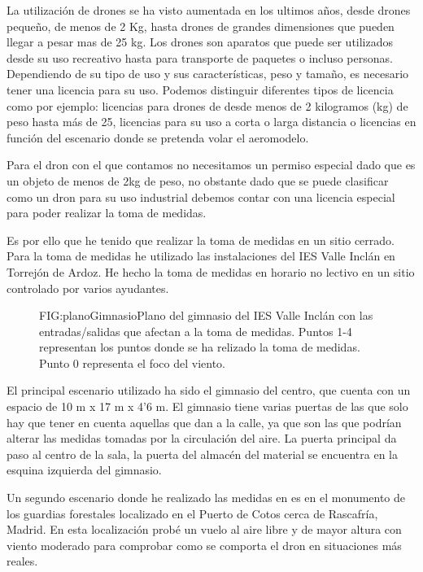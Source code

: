 
La utilización de drones se ha visto aumentada en los ultimos años, desde drones pequeño, de menos de 2 Kg, hasta drones de grandes dimensiones que pueden llegar a pesar mas de 25 kg. Los drones son aparatos que puede ser utilizados desde su uso recreativo hasta para transporte de paquetes o incluso personas. Dependiendo de su tipo de uso y sus características, peso y tamaño, es necesario tener una licencia para su uso. Podemos distinguir diferentes tipos de licencia como por ejemplo: licencias para drones de desde menos de 2 kilogramos (kg) de peso hasta más de 25, licencias para su uso a corta o larga distancia o licencias en función del escenario donde se pretenda volar el aeromodelo.

Para el dron con el que contamos no necesitamos un permiso especial dado que es un objeto de menos de 2kg de peso, no obstante dado que se puede clasificar como un dron para su uso industrial debemos contar con una licencia especial para poder realizar la toma de medidas.

Es por ello que he tenido que realizar la toma de medidas en un sitio cerrado. Para la toma de medidas he utilizado las instalaciones del IES Valle Inclán en Torrejón de Ardoz. He hecho la toma de medidas en horario no lectivo en un sitio controlado por varios ayudantes.

\begin{figure}[Plano gimnasio IES Valle Inclán.]{FIG:planoGimnasio}{Plano del gimnasio del IES Valle Inclán con las entradas/salidas que afectan a la toma de medidas. Puntos 1-4 representan los puntos donde se ha relizado la toma de medidas. Punto 0 representa el foco del viento.}
\end{figure}

El principal escenario utilizado ha sido el gimnasio del centro, que cuenta con un espacio de 10 m x 17 m x 4'6 m. El gimnasio tiene varias puertas de las que solo hay que tener en cuenta aquellas que dan a la calle, ya que son las que podrían alterar las medidas tomadas por la circulación del aire. La puerta principal da paso al centro de la sala, la puerta del almacén del material se encuentra en la esquina izquierda del gimnasio. 

Un segundo escenario donde he realizado las medidas en es en el monumento de los guardias forestales localizado en el Puerto de Cotos cerca de Rascafría, Madrid. En esta localización probé un vuelo al aire libre y de mayor altura con viento moderado para comprobar como se comporta el dron en situaciones más reales.

